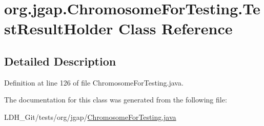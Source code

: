 \hypertarget{classorg_1_1jgap_1_1_chromosome_for_testing_1_1_test_result_holder}{\section{org.\-jgap.\-Chromosome\-For\-Testing.\-Test\-Result\-Holder Class Reference}
\label{classorg_1_1jgap_1_1_chromosome_for_testing_1_1_test_result_holder}
}


\subsection{Detailed Description}


Definition at line 126 of file Chromosome\-For\-Testing.\-java.



The documentation for this class was generated from the following file\-:\begin{DoxyCompactItemize}
\item 
L\-D\-H\-\_\-\-Git/tests/org/jgap/\hyperlink{_chromosome_for_testing_8java}{Chromosome\-For\-Testing.\-java}\end{DoxyCompactItemize}
